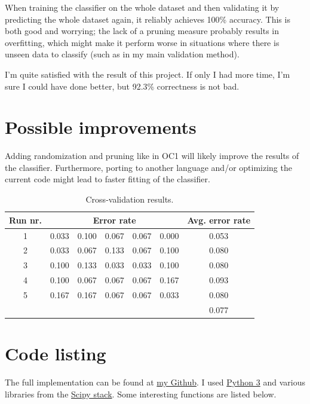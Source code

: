 \documentclass[12pt]{article}
\begin{document}
When training the classifier on the whole dataset and then validating it by predicting the whole dataset again, it reliably achieves 100\% accuracy. This is both good and worrying; the lack of a pruning measure probably results in overfitting, which might make it perform worse in situations where there is unseen data to classify (such as in my main validation method).

I'm quite satisfied with the result of this project. If only I had more time, I'm sure I could have done better, but 92.3\% correctness is not bad.

\section{Possible improvements}
Adding randomization and pruning like in OC1 will likely improve the results of the classifier. Furthermore, porting to another language and/or optimizing the current code might lead to faster fitting of the classifier.

\begin{table}[!ht]
\begin{tabular}{c|cccccc}
Run nr. & \multicolumn{5}{c}{Error rate} & Avg. error rate \\ \hline
1 & 0.033 & 0.100 & 0.067 & 0.067 & 0.000 & 0.053 \\
2 & 0.033 & 0.067 & 0.133 & 0.067 & 0.100 & 0.080 \\
3 & 0.100 & 0.133 & 0.033 & 0.033 & 0.100 & 0.080 \\
4 & 0.100 & 0.067 & 0.067 & 0.067 & 0.167 & 0.093 \\
5 & 0.167 & 0.167 & 0.067 & 0.067 & 0.033 & 0.080 \\ \hline
~ & ~     & ~     & ~     & ~     & ~     & 0.077
\end{tabular}
\caption{Cross-validation results.}
\label{tab:cvresults}
\end{table}

\appendix
\section{Code listing} \label{app:code}
The full implementation can be found at \href{http://github.com/KDercksen/pyblique}{my Github}. I used \href{http://www.python.org}{Python 3} and various libraries from the \href{http://www.scipy.org}{Scipy stack}. Some interesting functions are listed below.
\end{document}

